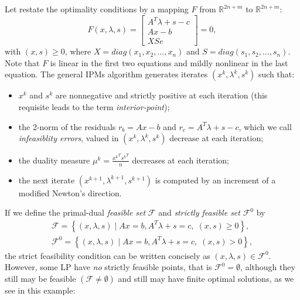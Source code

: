 \documentclass[a4paper,10 pt,titlepage,twoside]{book}
\theoremstyle{plain}
\theoremstyle{definition}
\theoremstyle{remark}
\begin{document}
 Let restate the optimality conditions by a mapping $\mathit{F}$ from $\mathbb{R}^{2n+m}$ to $\mathbb{R}^{2n+m}$:
\begin{equation}\label{F}
	\mathit{F}(x,\lambda,s)= \begin{bmatrix}
	A^{T}\lambda+s-c \\Ax-b \\XSe
	\end{bmatrix}=0,
\end{equation}
with $(x,s)\geq0$, where $X = diag(x_{1}, x_{2},...,x_{n})$ and $S = diag(s_{1}, s_{2},...,s_{n})$.\\
Note that $\mathit{F}$ is linear in the first two equations and mildly nonlinear in the last equation. 
The general IPMs algorithm generates iterates $(x^{k},\lambda^{k},s^{k})$ such that:
\begin{itemize}
	\item $x^{k}$ and $s^{k}$ are nonnegative and strictly positive at each iteration (this requisite leads to the term \textit{interior-point});
	\item the 2-norm of the residuals $r_{b} = Ax - b$ and $r_{c} =A^{T}\lambda +s - c$, which we call \textit{infeasiblity errors}, valued in $(x^{k},\lambda^{k},s^{k})$ decrease at each iteration;
	\item the duality measure $\mu^{k} = \frac{{x^{k}}^{T}{s^{k}}^{T}}{n}$ decreases at each iteration;
	\item the next iterate $(x^{k+1},\lambda^{k+1},s^{k+1})$ is computed by an increment of a modified Newton's direction.
\end{itemize}
If we define the primal-dual \textit{feasible set} $\mathcal{F}$ and \textit{strictly feasible set} $\mathcal{F}^{0}$ by
\begin{align*}
\mathcal{F} = \left\lbrace(x,\lambda,s)\;|\;Ax = b, A^{T}\lambda+s =c,\;(x,s)\geq0\right\rbrace, \\
\mathcal{F}^{0} = \left\lbrace(x,\lambda,s)\;|\;Ax = b, A^{T}\lambda+s =c,\;(x,s)>0\right\rbrace, 
\end{align*}
the strict feasibility condition can be written concisely as $(x,\lambda,s)\in\mathcal{F}^{0}$.\\
However, some LP have \textit{no} strictly feasible points, that is $\mathcal{F}^{0}=\emptyset$, although they still may be feasible $(\mathcal{F} \neq \emptyset)$ and still may have finite optimal solutions, as we see in this example:
\end{document}
